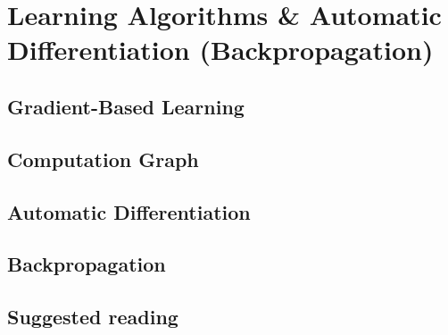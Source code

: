 \renewcommand{\prevpart}{3 }
\renewcommand{\thispart}{4 }
\renewcommand{\nextpart}{5 }

\section{Learning Algorithms \& Automatic Differentiation (Backpropagation)}





% 
\subsection{Gradient-Based Learning}

\subsection{Computation Graph}



\subsection{Automatic Differentiation}







\subsection{Backpropagation}

\subsection{Suggested reading}

